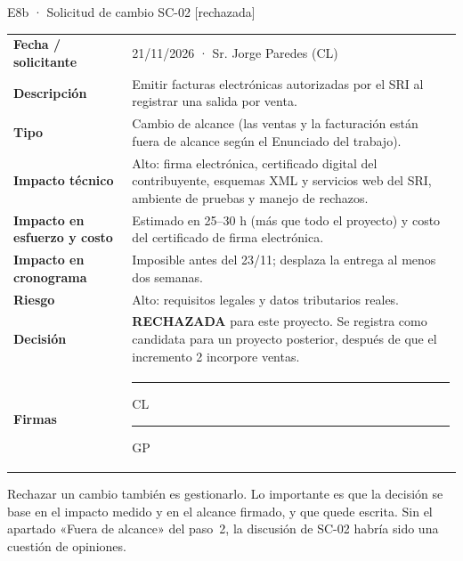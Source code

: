 \documentclass[11pt,a4paper]{article}
\begin{document}
\begin{evidencia}{E8b · Solicitud de cambio SC-02 [rechazada]}
\small
\begin{tabularx}{\linewidth}{@{}P{3.4cm}L@{}}
\toprule
\textbf{Fecha / solicitante} & 21/11/2026 · Sr. Jorge Paredes (CL) \\
\textbf{Descripción} & Emitir facturas electrónicas autorizadas por el SRI al registrar una salida por venta. \\
\textbf{Tipo} & Cambio de alcance (las ventas y la facturación están fuera de alcance según el Enunciado del trabajo). \\
\textbf{Impacto técnico} & Alto: firma electrónica, certificado digital del contribuyente, esquemas XML y servicios web del SRI, ambiente de pruebas y manejo de rechazos. \\
\textbf{Impacto en esfuerzo y costo} & Estimado en 25–30 h (más que todo el proyecto) y costo del certificado de firma electrónica. \\
\textbf{Impacto en cronograma} & Imposible antes del 23/11; desplaza la entrega al menos dos semanas. \\
\textbf{Riesgo} & Alto: requisitos legales y datos tributarios reales. \\
\textbf{Decisión} & \textbf{RECHAZADA} para este proyecto. Se registra como candidata para un proyecto posterior, después de que el incremento 2 incorpore ventas. \\
\textbf{Firmas} & \rule{3.8cm}{0.4pt} CL \qquad \rule{3.8cm}{0.4pt} GP \\
\bottomrule
\end{tabularx}
\end{evidencia}

\begin{consejo}
Rechazar un cambio también es gestionarlo. Lo importante es que la decisión se base en el impacto medido y en el alcance firmado, y que quede escrita. Sin el apartado «Fuera de alcance» del paso~2, la discusión de SC-02 habría sido una cuestión de opiniones.
\end{consejo}

\end{document}
